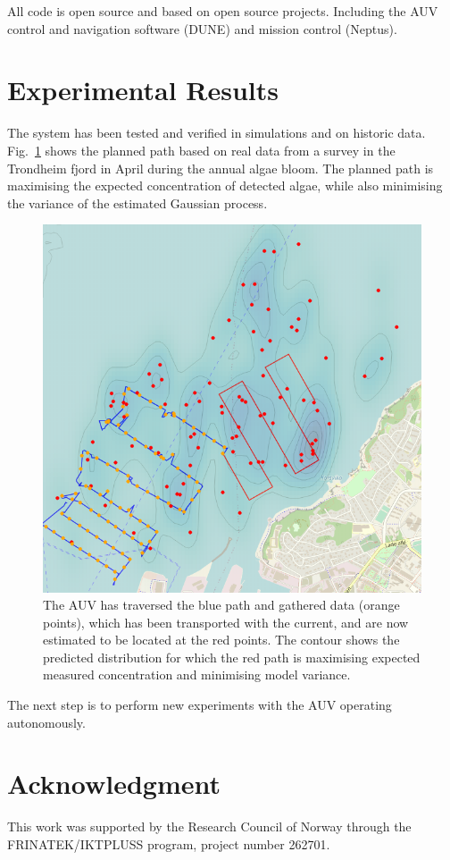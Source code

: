 \documentclass[conference]{IEEEtran}
\begin{document}
All code is open source and based on open source projects. Including the AUV control and navigation software (DUNE) and mission control (Neptus). 

\section{Experimental Results}
The system has been tested and verified in simulations and on historic data. Fig.~\ref{fig:munkholmen} shows the planned path based on real data from a survey in the Trondheim fjord in April during the annual algae bloom. The planned path is maximising the expected concentration of detected algae, while also minimising the variance of the estimated Gaussian process.
\begin{figure}[tbp]
\centerline{\includegraphics[width=\linewidth]{figures/munkholmen_planned_path.png}}
\caption{The AUV has traversed the blue path and gathered data (orange points), which has been transported with the current, and are now estimated to be located at the red points.
The contour shows the predicted distribution for which the red path is maximising expected measured concentration and minimising model variance.}
\label{fig:munkholmen}
\end{figure}

The next step is to perform new experiments with the AUV operating autonomously.
\section*{Acknowledgment}
This work was supported by the Research Council of Norway through the FRINATEK/IKTPLUSS program, project number 262701.
\end{document}
